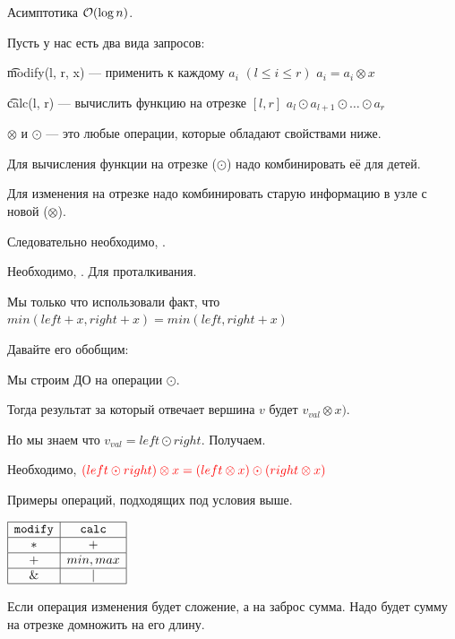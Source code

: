 Асимптотика $\mathcal{O}(\log n)$.


Пусть у нас есть два вида запросов:

\begin{MyList}[0pt]
	\item \t{modify(l, r, x)} --- применить к каждому $a_i$ $(l \le i \le r)$ $a_i = a_i \otimes x$
	\item \t{calc(l, r)} --- вычислить функцию на отрезке $[l, r]$ $a_l \odot a_{l + 1} \odot \ldots \odot a_r$
\end{MyList}

$\otimes$ и $\odot$ — это любые операции, которые обладают свойствами ниже.
\down

Для вычисления функции на отрезке ($\odot$) надо комбинировать её для детей.

Для изменения на отрезке надо комбинировать старую информацию в узле с новой ($\otimes$).

Следовательно необходимо, .
\down

Необходимо, . Для проталкивания.
\down

Мы только что использовали факт, что $min(left + x, right + x) = min(left, right + x)$

Давайте его обобщим:

Мы строим ДО на операции $\odot$.

Тогда результат за который отвечает вершина $v$ будет $v_{val} \otimes x)$.

Но мы знаем что $v_{val} = left \odot right$. Получаем.

Необходимо, ${\color{red}{(left \odot right) \otimes x = (left \otimes x) \odot (right \otimes x)}}$
\down

Примеры операций, подходящих под условия выше.

\begin{center}
	$\begin{array}{| c | c |} \hline \texttt{modify} & \texttt{calc} \\ \hline * & + \\ \hline + & min, max \\ \hline \& & | \\ \hline \end{array}$
\end{center}

Если операция изменения будет сложение, а на заброс сумма. Надо будет сумму на отрезке домножить на его длину.

